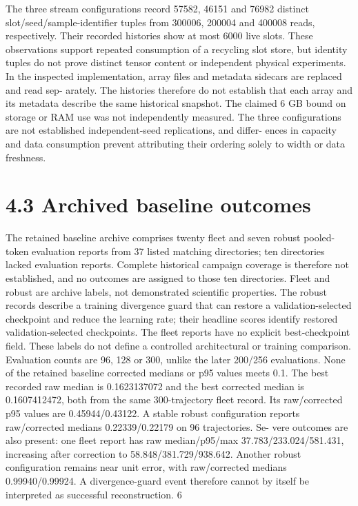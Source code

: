 \documentclass[11pt]{article}
\begin{document}
The three stream configurations record 57582, 46151 and 76982 distinct slot/seed/sample-identifier
tuples from 300006, 200004 and 400008 reads, respectively. Their recorded histories show at most
6000 live slots. These observations support repeated consumption of a recycling slot store, but
identity tuples do not prove distinct tensor content or independent physical experiments.
In the inspected implementation, array files and metadata sidecars are replaced and read sep-
arately. The histories therefore do not establish that each array and its metadata describe the
same historical snapshot. The claimed 6 GB bound on storage or RAM use was not independently
measured. The three configurations are not established independent-seed replications, and differ-
ences in capacity and data consumption prevent attributing their ordering solely to width or data
freshness.

\section*{4.3 Archived baseline outcomes}

The retained baseline archive comprises twenty fleet and seven robust pooled-token evaluation
reports from 37 listed matching directories; ten directories lacked evaluation reports. Complete
historical campaign coverage is therefore not established, and no outcomes are assigned to those
ten directories. Fleet and robust are archive labels, not demonstrated scientific properties. The
robust records describe a training divergence guard that can restore a validation-selected checkpoint
and reduce the learning rate; their headline scores identify restored validation-selected checkpoints.
The fleet reports have no explicit best-checkpoint field. These labels do not define a controlled
architectural or training comparison. Evaluation counts are 96, 128 or 300, unlike the later 200/256
evaluations. None of the retained baseline corrected medians or p95 values meets 0.1.
The best recorded raw median is 0.1623137072 and the best corrected median is 0.1607412472,
both from the same 300-trajectory fleet record. Its raw/corrected p95 values are 0.45944/0.43122. A
stable robust configuration reports raw/corrected medians 0.22339/0.22179 on 96 trajectories. Se-
vere outcomes are also present: one fleet report has raw median/p95/max 37.783/233.024/581.431,
increasing after correction to 58.848/381.729/938.642. Another robust configuration remains near
unit error, with raw/corrected medians 0.99940/0.99924. A divergence-guard event therefore cannot
by itself be interpreted as successful reconstruction.
6
\end{document}

